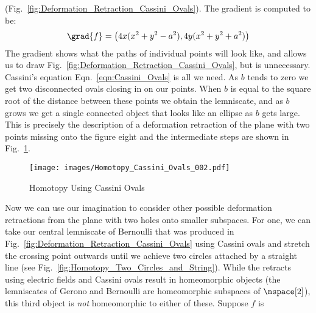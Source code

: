 \documentclass{book}                                                           %
\begin{document}
                (Fig.~\ref{fig:Deformation_Retraction_Cassini_Ovals}). The
                gradient is computed to be:
                \begin{equation}
                    \grad{f}=\big(4x(x^{2}+y^{2}-a^{2}),4y(x^{2}+y^{2}+a^2)\big)
                \end{equation}
                The gradient shows what the paths of individual points will look
                like, and allows us to draw
                Fig.~\ref{fig:Deformation_Retraction_Cassini_Ovals}, but is
                unnecessary. Cassini's equation Eqn.~\ref{eqn:Cassini_Ovals} is
                all we need. As $b$ tends to zero we get two disconnected ovals
                closing in on our points. When $b$ is equal to the square root
                of the distance between these points we obtain the lemniscate,
                and as $b$ grows we get a single connected object that looks
                like an ellipse as $b$ gets large. This is precisely the
                description of a deformation retraction of the plane with two
                points missing onto the figure eight and the intermediate steps
                are shown in Fig.~\ref{fig:Homotopy_Cassini_Ovals}.
                \begin{figure}
                    \centering
                    \captionsetup{type=figure}
                    \texttt{[image: images/Homotopy\_Cassini\_Ovals\_002.pdf]}
                    \caption{Homotopy Using Cassini Ovals}
                    \label{fig:Homotopy_Cassini_Ovals}
                \end{figure}
                \par\hfill\par
                Now we can use our imagination to consider other possible
                deformation retractions from the plane with two holes onto
                smaller subspaces. For one, we can take our central lemniscate
                of Bernoulli that was produced in
                Fig.~\ref{fig:Deformation_Retraction_Cassini_Ovals} using
                Cassini ovals and stretch the crossing point outwards until we
                achieve two circles attached by a straight line
                (see Fig.~\ref{fig:Homotopy_Two_Circles_and_String}). While the
                retracts using electric fields and Cassini ovals result in
                homeomorphic objects (the lemniscates of Gerono and  Bernoulli
                are homeomorphic subspaces of $\nspace[2]$), this third object
                is \textit{not} homeomorphic to either of these. Suppose $f$ is
\end{document}
